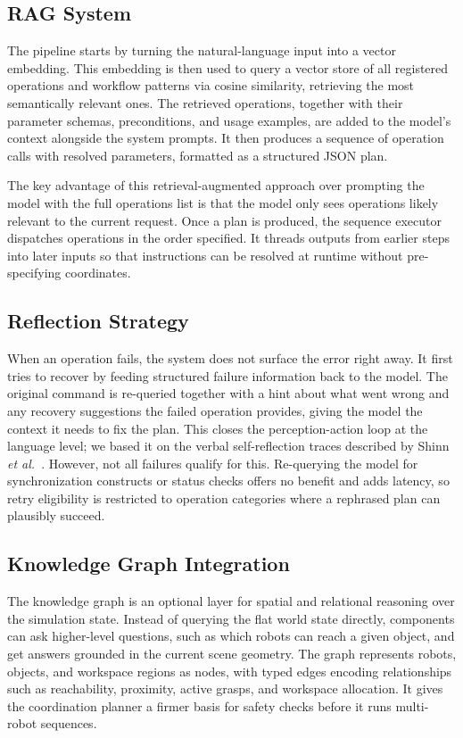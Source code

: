 \documentclass[
     12pt,
     a4paper,
     BCOR=10mm,
     DIV=14,
     listof=totoc,
     bibliography=totoc,
     parskip,
     twoside,
     headsepline
     ]{scrreprt}
\begin{document}
\subsection{RAG System}\label{sec:rag}
The pipeline starts by turning the natural-language input into a vector embedding. This embedding is then used to query a vector store of all registered operations and workflow patterns via cosine similarity, retrieving the most semantically relevant ones. The retrieved operations, together with their parameter schemas, preconditions, and usage examples, are added to the model's context alongside the system prompts. It then produces a sequence of operation calls with resolved parameters, formatted as a structured JSON plan.

The key advantage of this retrieval-augmented approach over prompting the model with the full operations list is that the model only sees operations likely relevant to the current request. Once a plan is produced, the sequence executor dispatches operations in the order specified. It threads outputs from earlier steps into later inputs so that instructions can be resolved at runtime without pre-specifying coordinates.

\subsection{Reflection Strategy}\label{sec:reflection}
When an operation fails, the system does not surface the error right away. It first tries to recover by feeding structured failure information back to the model. The original command is re-queried together with a hint about what went wrong and any recovery suggestions the failed operation provides, giving the model the context it needs to fix the plan. This closes the perception-action loop at the language level; we based it on the verbal self-reflection traces described by Shinn \emph{et al.}~\cite{shinn2023reflexionlanguageagentsverbal}. However, not all failures qualify for this. Re-querying the model for synchronization constructs or status checks offers no benefit and adds latency, so retry eligibility is restricted to operation categories where a rephrased plan can plausibly succeed.

\subsection{Knowledge Graph Integration}\label{sec:kg-integration}
The knowledge graph is an optional layer for spatial and relational reasoning over the simulation state. Instead of querying the flat world state directly, components can ask higher-level questions, such as which robots can reach a given object, and get answers grounded in the current scene geometry. The graph represents robots, objects, and workspace regions as nodes, with typed edges encoding relationships such as reachability, proximity, active grasps, and workspace allocation. It gives the coordination planner a firmer basis for safety checks before it runs multi-robot sequences.
\end{document}
